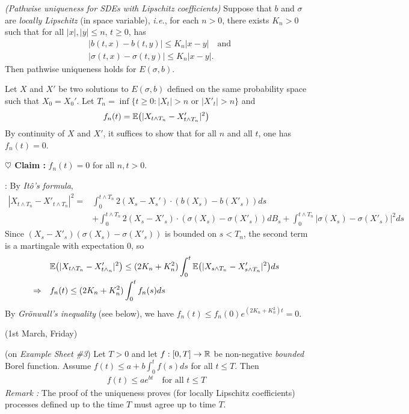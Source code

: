 \documentclass[12pt,a4paper]{article}
\newenvironment{proof}
{\begin{changemargin}{0.5cm}{0.5cm} 
	}%
	{\end{changemargin}
}
\newenvironment{subproof}
{\begin{changemargin}{0.5cm}{0.5cm} 
	}%
	{\end{changemargin}
}
\newenvironment{p}
{\begin{proof} 
	}%
	{\end{proof}
}
\begin{document}
\thm \emph{(Pathwise uniqueness for SDEs with Lipschitz coefficients)} Suppose that $b$ and $\sigma$ are \emph{locally Lipschitz} (in space variable), \textit{i.e.}, for each $n >0$, there exists $K_n >0$ such that for all $|x|, |y| \leq n$, $t\geq 0$, has 
\begin{align*}
&|b(t,x) - b(t, y)| \leq K_n |x-y| \quad \text{and} \\
&|\sigma(t,x) - \sigma(t,y)| \leq K_n |x-y|.
\end{align*}
Then pathwise uniqueness holds for $E(\sigma,b)$.
\begin{p}
\pf Let $X$ and $X'$ be two solutions to $E(\sigma, b)$ defined on the same probability space such that $X_0 = X_0'$. Let $T_n = \inf \{t\geq 0: |X_t| >n \text{ or }|X'_t| >n \}$ and
\begin{align*}
f_n(t) = \mathbb{E} \big( |X_{t\wedge T_n} - X'_{t\wedge T_n}|^2 \big)
\end{align*}
By continuity of $X$ and $X'$, it suffices to show that for all $n$ and all $t$, one has $f_n(t) =0$. 

\textbf{$\heartsuit$ Claim :} $f_n(t) = 0$ for all $n, t>0$.
\begin{subproof}
: By \emph{It\^o's formula},
\begin{align*}
|X_{t\wedge T_n} - X'_{t\wedge T_n}|^2 = & \int_0^{t\wedge T_n } 2(X_s - X_s') \cdot (b(X_s)- b(X'_s)) ds \\
& + \int_0^{t\wedge T_n} 2(X_s - X'_s) \cdot (\sigma(X_s) - \sigma(X'_s)) dB_s + \int_0^{t\wedge T_n} |\sigma(X_s) - \sigma(X'_s)|^2 ds
\end{align*}
Since $(X_s - X'_s)(\sigma(X_s)- \sigma(X'_s))$ is bounded on $s< T_n$, the second term is a martingale with expectation 0, so
\begin{align*}
& \mathbb{E} \big( |X_{t\wedge T_n} - X'_{t\wedge_n}|^2 \big) \leq  (2K_n + K_n^2) \int_0^{t} \mathbb{E}\big( |X_{s\wedge T_n} - X'_{s\wedge T_n}|^2 \big) ds \\
\Rightarrow \quad &f_n(t) \leq (2K_n + K_n^2) \int_0^{t} f_n(s) ds
\end{align*}
By \emph{Gr\"onwall's inequality} (see below), we have $f_n(t) \leq  f_n(0) e^{(2K_n + K_n^2)t} =0$.
\end{subproof} 
\eop
\end{p}
\s

\newday

(1st March, Friday)
\s

 (on \emph{Example Sheet \#3}) Let $T>0$ and let $f:[0, T] \rightarrow \mathbb{R}$ be non-negative \emph{bounded} Borel function. Assume $f(t) \leq a + b \int_0^t f(s) ds$ for all $t\leq T$. Then
\begin{align*}
f(t) \leq ae^{bt} \quad \text{for all } t\leq T
\end{align*}
\emph{Remark :} The proof of the uniqueness proves (for locally Lipschitz coefficients) processes defined up to the time $T$ must agree up to time $T$.
\end{document}
